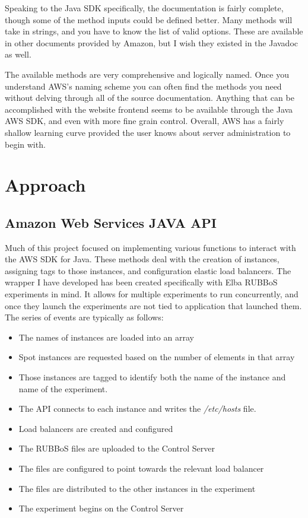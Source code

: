 \documentclass{article}
\begin{document}
Speaking to the Java SDK specifically, the documentation is fairly complete, though some of the method inputs could be defined better. Many methods will take in strings, and you have to know the list of valid options. These are available in other documents provided by Amazon, but I wish they existed in the Javadoc as well.

The available methods are very comprehensive and logically named. Once you understand AWS's naming scheme you can often find the methods you need without delving through all of the source documentation. Anything that can be accomplished with the website frontend seems to be available through the Java AWS SDK, and even with more fine grain control. Overall, AWS has a fairly shallow learning curve provided the user knows about server administration to begin with.
\section{Approach}
\subsection{Amazon Web Services JAVA API}
Much of this project focused on implementing various functions to interact with  the AWS SDK for Java. These methods deal with the creation of instances, assigning tags to those instances, and configuration elastic load balancers. The wrapper I have developed has been created specifically with Elba RUBBoS experiments in mind. It allows for multiple experiments to run concurrently, and once they launch the experiments are not tied to application that launched them.
The series of events are typically as follows:
\begin{itemize}
\item The names of instances are loaded into an array
\item Spot instances are requested based on the number of elements in that array
\item Those instances are tagged to identify both the name of the instance and name of the experiment.
\item The API connects to each instance and writes the {\it /etc/hosts} file.
\item Load balancers are created and configured
\item The RUBBoS files are uploaded to the Control Server
\item The files are configured to point towards the relevant load balancer
\item The files are distributed to the other instances in the experiment
\item The experiment begins on the Control Server
\end{itemize}
\end{document}
